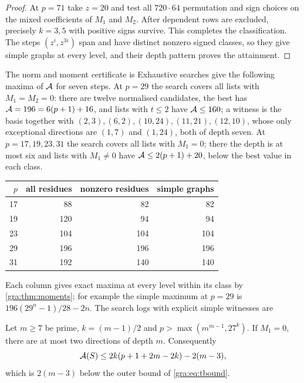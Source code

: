 \begin{proof}
At $p=71$ take $z=20$ and test all $720\cdot64$ permutation and sign
choices on the mixed coefficients of $M_1$ and $M_2$. After dependent rows
are excluded, precisely $k=3,5$ with positive signs survive. This
completes the classification. The steps $(z^i,z^{3i})$ span and have
distinct nonzero signed classes, so they give simple graphs at every
level, and their depth pattern proves the attainment.
\end{proof}

The norm and moment certificate is
Exhaustive searches give the following maxima of $\mathcal{A}$ for seven steps.
At $p=29$ the search covers all lists with $M_1=M_2=0$: there are twelve
normalised candidates, the best has $\mathcal{A}=196=6(p+1)+16$, and lists with
$t\le2$ have $\mathcal{A}\le160$; a witness is the basis together with
$(2,3),(6,2),(10,24),(11,21),(12,10)$, whose only exceptional directions
are $(1,7)$ and $(1,24)$, both of depth seven. At $p=17,19,23,31$ the
search covers all lists with $M_1=0$; there the depth is at most six and
lists with $M_1\ne0$ have $\mathcal{A}\le2(p+1)+20$, below the best value in
each class.
\begin{center}\small\upshape
\begin{tabular}{rrrr}
\toprule
$p$ & all residues & nonzero residues & simple graphs\\
\midrule
17 & 88 & 82 & 82\\
19 & 120 & 94 & 94\\
23 & 104 & 104 & 104\\
29 & 196 & 196 & 196\\
31 & 192 & 140 & 140\\
\bottomrule
\end{tabular}
\end{center}
Each column gives exact maxima at every level within its class by
\cref{gra:thm:moments}; for example the simple maximum at $p=29$ is
$196(29^n-1)/28-2n$. The search logs with explicit simple witnesses are

\begin{theorem}\label{gra:thm:primestep}
Let $m\ge7$ be prime, $k=(m-1)/2$ and $p>\max(m^{m-1},27^k)$. If $M_1=0$,
there are at most two directions of depth $m$. Consequently
\[
 \mathcal{A}(S)\le2k(p+1+2m-2k)-2(m-3),
\]
which is $2(m-3)$ below the outer bound of \eqref{gra:eq:tbound}.
\end{theorem}

